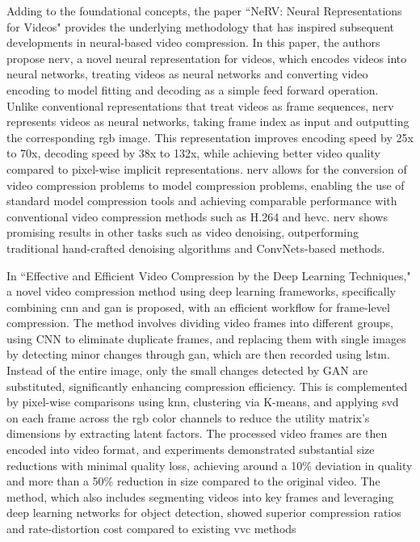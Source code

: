 Adding to the foundational concepts, the paper ``NeRV: Neural Representations for Videos" \cite{chen2021nerv} provides the underlying methodology that has inspired subsequent developments in neural-based video compression. In this paper, the authors propose \gls{nerv}, a novel neural representation for videos, which encodes videos into neural networks, treating videos as neural networks and converting video encoding to model fitting and decoding as a simple feed forward operation. Unlike conventional representations that treat videos as frame sequences, \gls{nerv} represents videos as neural networks, taking frame index as input and outputting the corresponding \gls{rgb} image. This representation improves encoding speed by 25x to 70x, decoding speed by 38x to 132x, while achieving better video quality compared to pixel-wise implicit representations. \gls{nerv} allows for the conversion of video compression problems to model compression problems, enabling the use of standard model compression tools and achieving comparable performance with conventional video compression methods such as H.264 and \gls{hevc}. \gls{nerv} shows promising results in other tasks such as video denoising, outperforming traditional hand-crafted denoising algorithms and ConvNets-based methods.

In ``Effective and Efficient Video Compression by the Deep Learning Techniques," \cite{paneerselvam_effective} a novel video compression method using deep learning frameworks, specifically combining \gls{cnn} and \gls{gan} is proposed, with an efficient workflow for frame-level compression. The method involves dividing video frames into different groups, using CNN to eliminate duplicate frames, and replacing them with single images by detecting minor changes through \gls{gan}, which are then recorded using \gls{lstm}. Instead of the entire image, only the small changes detected by GAN are substituted, significantly enhancing compression efficiency. This is complemented by pixel-wise comparisons using \gls{knn}, clustering via K-means, and applying \gls{svd} on each frame across the \gls{rgb} color channels to reduce the utility matrix's dimensions by extracting latent factors. The processed video frames are then encoded into video format, and experiments demonstrated substantial size reductions with minimal quality loss, achieving around a 10\% deviation in quality and more than a 50\% reduction in size compared to the original video. The method, which also includes segmenting videos into key frames and leveraging deep learning networks for object detection, showed superior compression ratios and rate-distortion cost compared to existing \gls{vvc} methods

